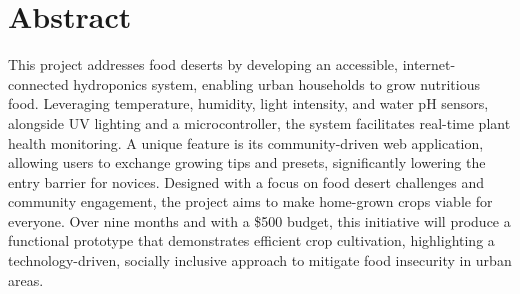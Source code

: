 \documentclass[12pt]{article} %
\begin{document}
\listoffigures
\pagebreak

\section*{Abstract}
\noindent This project addresses food deserts by developing an accessible, internet-connected hydroponics system, enabling urban households to grow nutritious food. Leveraging temperature, humidity, light intensity, and water pH sensors, alongside UV lighting and a microcontroller, the system facilitates real-time plant health monitoring. A unique feature is its community-driven web application, allowing users to exchange growing tips and presets, significantly lowering the entry barrier for novices. Designed with a focus on food desert challenges and community engagement, the project aims to make home-grown crops viable for everyone. Over nine months and with a \$500 budget, this initiative will produce a functional prototype that demonstrates efficient crop cultivation, highlighting a technology-driven, socially inclusive approach to mitigate food insecurity in urban areas.

\end{document}
